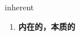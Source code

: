 
\begin{frame}
{\huge inherent}
\begin{center}
\begin{enumerate}\Large
  \item \textbf{内在的，本质的}
\end{enumerate}
\end{center}
\end{frame}
